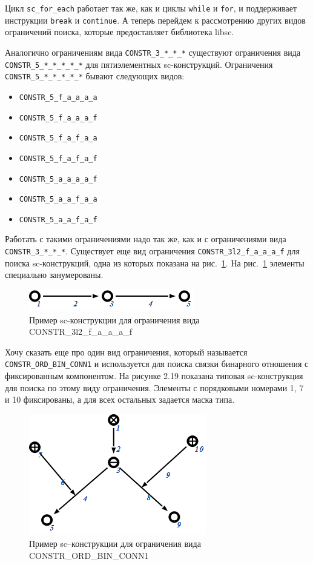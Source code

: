 Цикл \lstinline|sc_for_each| работает так же, как и циклы
\lstinline|while| и \lstinline|for|, и поддерживает инструкции
\lstinline|break| и \lstinline|continue|.  А теперь перейдем к
рассмотрению других видов ограничений поиска, которые предоставляет
библиотека libsc.

Аналогично ограничениям вида \verb|CONSTR_3_*_*_*| существуют
ограничения вида \verb|CONSTR_5_*_*_*_*_*| для пятиэлементных
sc-конструкций. Ограничения \verb|CONSTR_5_*_*_*_*_*| бывают следующих
видов:
\begin{itemize}
\item \lstinline|CONSTR_5_f_a_a_a_a|
\item \lstinline|CONSTR_5_f_a_a_a_f|
\item \lstinline|CONSTR_5_f_a_f_a_a|
\item \lstinline|CONSTR_5_f_a_f_a_f|
\item \lstinline|CONSTR_5_a_a_a_a_f|
\item \lstinline|CONSTR_5_a_a_f_a_a|
\item \lstinline|CONSTR_5_a_a_f_a_f|
\end{itemize}

Работать с такими ограничениями надо так же, как и с ограничениями
вида \verb|CONSTR_3_*_*_*|.  Существует еще вид ограничения
\lstinline|CONSTR_3l2_f_a_a_a_f| для поиска sc-конструкций, одна из
которых показана на рис.~\ref{fig:CONSTR_3l2}. На
рис.~\ref{fig:CONSTR_3l2} элементы специально занумерованы.

\begin{figure}
  \centering
  \includegraphics{images/4/search/CONSTR_3l2}
  \caption{ Пример sc-конструкции для ограничения вида CONSTR_3l2_f_a_a_a_f}
  \label{fig:CONSTR_3l2}
\end{figure}

Хочу сказать еще про один вид ограничения, который называется
\lstinline|CONSTR_ORD_BIN_CONN1| и используется для поиска связки бинарного
отношения с фиксированным компонентом. На рисунке 2.19 показана
типовая sc-конструкция для поиска по этому виду ограничения. Элементы
с порядковыми номерами 1, 7 и 10 фиксированы, а для всех остальных
задается маска типа.

\begin{figure}
  \centering
  \includegraphics{images/4/search/CONSTR_ORD_BIN_CONN1}
  \caption{ Пример sc--конструкции для ограничения вида CONSTR_ORD_BIN_CONN1}
  \label{fig:CONSTR_ORD_BIN_CONN1}
\end{figure}


